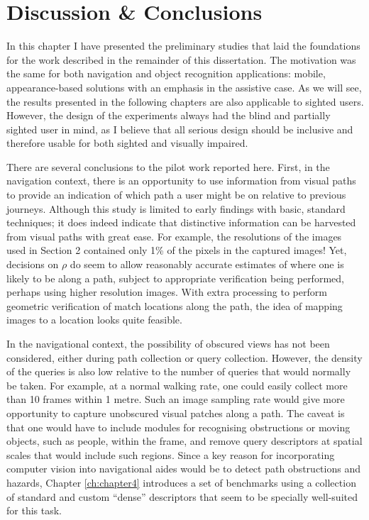 

\section{Discussion \& Conclusions}

In this chapter I have presented the preliminary studies that laid the foundations for the work described in the remainder of this dissertation. The motivation was the same for both navigation and object recognition applications: mobile, appearance-based solutions with an emphasis in the assistive case. As we will see, the results presented in the following chapters are also applicable to sighted users. However, the design of the experiments always had the blind and partially sighted user in mind, as I believe that all serious design should be inclusive and therefore usable for both sighted and visually impaired. 

There are several conclusions to the pilot work reported here.  First, in the navigation context, there is an opportunity to use information from visual paths to provide an indication of which path a user might be on relative to previous journeys.  Although this study is limited to early findings with basic, standard techniques; it does indeed indicate that distinctive information can be harvested from visual paths with great ease.  For example, the resolutions of the images used in Section 2 contained only 1\% of the pixels in the captured images!  Yet, decisions on $\rho$ do seem to allow reasonably accurate estimates of where one is likely to be along a path, subject to appropriate verification being performed, perhaps using higher resolution images. With extra processing to perform geometric verification of match locations along the path, the idea of mapping images to a location looks quite feasible.

In the navigational context, the possibility of obscured views has not been considered, either during path collection or query collection. However, the density of the queries is also low relative to the number of queries that would normally be taken. For example, at a normal walking rate, one could easily collect more than 10 frames within 1 metre. Such an image sampling rate would give more opportunity to capture unobscured visual patches along a path. The caveat is that one would have to include modules for recognising obstructions or moving objects, such as people, within the frame, and remove query descriptors at  spatial scales that would include such regions. Since a key reason for incorporating computer vision into navigational aides would be to detect path obstructions and hazards, Chapter \ref{ch:chapter4} introduces a set of benchmarks using a collection of standard and custom ``dense'' descriptors that seem to be specially well-suited for this task.

